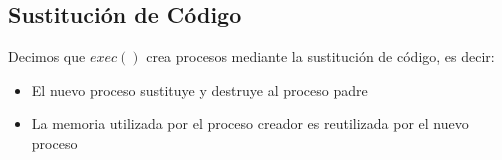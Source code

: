 \documentclass[12pt, fleqn]{report}                             %
\begin{document}
                \subsection{Sustitución de Código}

                    Decimos que $exec()$ crea procesos mediante la sustitución de código, es decir:
                    \begin{itemize}
                        \item El nuevo proceso sustituye y destruye al proceso padre
                        \item La memoria utilizada por el proceso creador es reutilizada por el nuevo
                        proceso
                    \end{itemize}

                \clearpage
\end{document}
